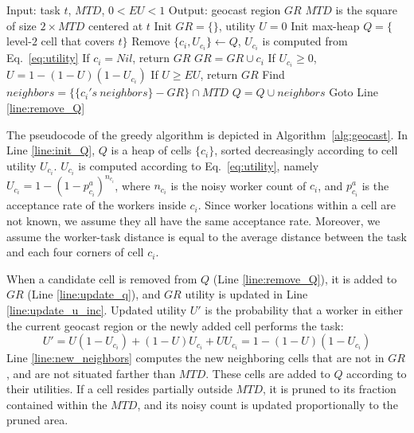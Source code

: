 \documentclass{USC-Thesis}
\renewcommand{\sc}{\textsc}
\numberwithin{equation}{chapter}
\begin{document}
\begin{algorithm} [ht]
\caption{\sc Greedy Algorithm (GDY)}
\small
\begin{algorithmic}[1]
\STATE Input: task $t$, $\mathit{MTD}$, $0$$<$$\mathit{EU}$$<$$1$%
\STATE Output: geocast region $\mathit{GR}$
\STATE $\mathit{MTD}$ is the square of size $2 \times \mathit{MTD}$ centered at $t$
\STATE Init $\mathit{GR}=\{\}$, utility $U=0$
\STATE Init max-heap $Q=\{$level-$2$ cell that covers $t\}$ \label{line:init_Q}
\STATE Remove $\{c_i,U_{c_i}\}\leftarrow Q$, $U_{c_i}$ is computed from Eq.~\eqref{eq:utility} \label{line:remove_Q}
\STATE If $c_i=Nil$, return $\mathit{GR}$ 
\STATE $\mathit{GR=GR}\cup c_i$ \label{line:update_q}
\STATE If $U_{c_i}\ge 0$, $U=1-(1-U)(1-U_{c_i})$ \label{line:update_u_inc}
\STATE If $U\ge EU$, return $\mathit{GR}$ \label{line:return_u}
\STATE Find $\mathit{neighbors} = \{\{{c_i}'s\ \mathit{neighbors\}}-\mathit{GR}\} \cap \mathit{MTD}$ \label{line:new_neighbors}
\STATE $Q=Q\cup \mathit{neighbors}$ \label{line:update_heap}
\STATE Goto Line \ref{line:remove_Q}
\end{algorithmic}
\label{alg:geocast}
\end{algorithm}

The pseudocode of the greedy algorithm is depicted in Algorithm~\ref{alg:geocast}. In Line \ref{line:init_Q}, $Q$ is a heap of cells $\{c_i\}$, sorted decreasingly according to cell utility $U_{c_i}$. $U_{c_i}$ is computed according to Eq.~\eqref{eq:utility}, namely $U_{c_i}=1-(1-p^a_{c_i})^{n_{c_i}}$, where $n_{c_i}$ is the noisy worker count of $c_i$, and $p^a_{c_i}$ is the acceptance rate of the workers inside $c_i$. Since worker locations within a cell are not known, we assume they all have the same acceptance rate. Moreover, we assume the worker-task distance is equal to the average distance between the task and each four corners of cell $c_i$. 

When a candidate cell is removed from $Q$ (Line \ref{line:remove_Q}), it is added to $\mathit{GR}$ (Line \ref{line:update_q}), and $\mathit{GR}$ utility is updated in Line \ref{line:update_u_inc}. Updated utility $U'$ is the probability that a worker in either the current geocast region or the newly added cell performs the task: 
$$U' = U(1-U_{c_i}) + (1-U)U_{c_i} + UU_{c_i}=1-(1-U)(1-U_{c_i})$$
Line \ref{line:new_neighbors} computes the new neighboring cells that are not in $\mathit{GR}$, and are not situated farther than $\mathit{MTD}$. These cells are added to $Q$ according to their utilities. If a cell resides partially outside $MTD$, it is pruned to its fraction contained within the $MTD$, and its noisy count is updated proportionally to the pruned area.
\end{document}
